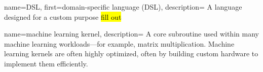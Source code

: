 {
    name={DSL},
    first={domain-specific language (DSL)},
    description={
A language designed for a custom purpose \hl{fill out}
    }
}

{
    name={machine learning kernel},
    description={
A core subroutine used within many machine learning workloads---for example,
  matrix multiplication.
Machine learning kernels are often highly optimized,
  often by building custom hardware to implement
  them efficiently.
    }
}